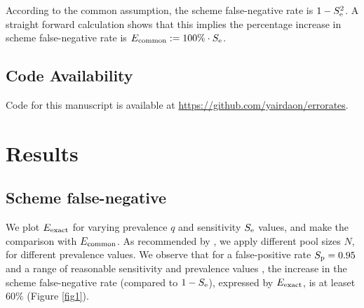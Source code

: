 \documentclass{article}
\begin{document}
According to the common assumption, the scheme false-negative rate is
$1-S_\text{e}^2$. A straight forward calculation shows that this implies the
percentage increase in scheme false-negative rate is $E_{\text{{common}}} :=
100\%\cdot S_\text{e}$.

\subsection*{Code Availability}
Code for this manuscript is available at
\url{https://github.com/yairdaon/errorates}.

\section*{Results}\label{section:results}
\subsection*{Scheme false-negative}
We plot $E_{\text{{exact}}}$ for varying prevalence $q$ and sensitivity $S_\text{e}$
values, and make the comparison with $E_{\text{{common}}}$. As recommended by
\cite{DorfmanYuvalDor}, we apply different pool sizes $N$, for
different prevalence values. We observe that for a false-positive rate
$S_\text{p}=0.95$ \cite{DorfmanYuvalDor} and a range of reasonable
sensitivity and prevalence values \cite{KitComparison,
  InterpretingCOVID19Test, EstimatingRatesLourenco,
  FalsePositiveEstimate}, the increase in the scheme false-negative rate
(compared to $1-S_\text{e}$), expressed by $E_{\text{{exact}}}$, is at leaset
$60\%$ (Figure \ref{fig1}).
\end{document}
